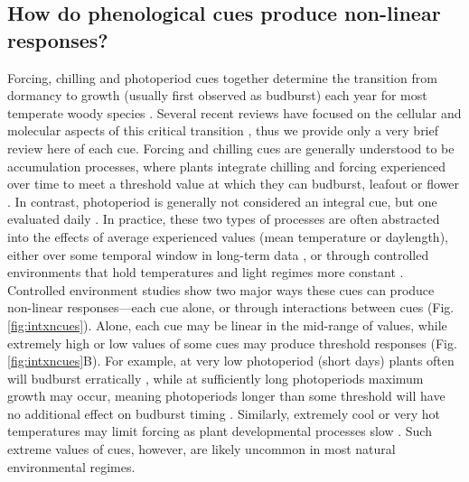 \documentclass[11pt,letter]{article}
\begin{document}
\subsection{How do phenological cues produce non-linear responses?}
Forcing, chilling and photoperiod cues together determine the transition from dormancy to growth (usually first observed as budburst) each year for most temperate woody species \citep{chuinearees,ettinger2020}. Several recent reviews have focused on the cellular and molecular aspects of this critical transition \citep{vanderschoot2014,Singh:2017,chang2021}, thus we provide only a very brief review here of each cue. Forcing and chilling cues are generally understood to be accumulation processes, where plants integrate chilling and forcing experienced over time to meet a threshold value at which they can budburst, leafout or flower \citep{Chuine2000}. In contrast, photoperiod is generally not considered an integral cue, but one evaluated daily \citep{Singh:2017}. In practice, these two types of processes are often abstracted into the effects of average experienced values (mean temperature or daylength), either over some temporal window in long-term data \citep[e.g.,][]{Wolkovich:2012n,fu2015}, or through controlled environments that hold temperatures and light regimes more constant \citep[e.g.,][]{Worrall:1967aa,Heide:1993,Heide:1993a,Skuterud:1994aa}. \\

Controlled environment studies show two major ways these cues can produce non-linear responses---each cue alone, or through interactions between cues (Fig. \ref{fig:intxncues}). Alone, each cue may be linear in the mid-range of values, while extremely high or low values of some cues may produce threshold responses (Fig. \ref{fig:intxncues}B). For example, at very low photoperiod (short days) plants often will budburst erratically \citep{Heide:1993,Partanen:1998aa,Singh:2017,rinne2018}, while at sufficiently long photoperiods maximum growth may occur, meaning photoperiods longer than some threshold will have no additional effect on budburst timing \citep[e.g.,][]{major1980}. Similarly, extremely cool or very hot temperatures may limit forcing as plant developmental processes slow \citep{parent2012}. Such extreme values of cues, however, are likely uncommon in most natural environmental regimes.\\ %
\end{document}
